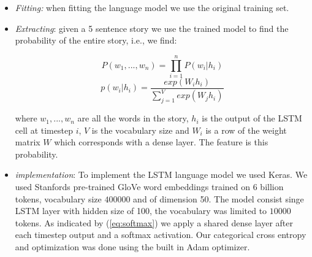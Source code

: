 \documentclass{article}
\begin{document}
\begin{itemize}

	\item \textit{Fitting:} when fitting the language model we use the original training set.

	\item \textit{Extracting}: given a 5 sentence story we use the trained
            model to find the probability of the entire story, i.e., we find:
	\begin{multicols}{2}
		\begin{equation}
		P(w_1, ..., w_n) = \prod_{i=1}^{n} P(w_i|h_i)
		\end{equation}\break
		\begin{equation}
		\label{eq:softmax}
		p(w_i|h_i) = \frac{exp(W_ih_i)}{\sum_{j=1}^{V}exp(W_jh_i)}
		\end{equation}
	\end{multicols}
        where $w_1, ..., w_n$ are all the words in the story, $h_i$ is the
        output of the LSTM cell at timestep $i$, $V$ is the vocabulary size and
        $W_i$ is a row of the weight matrix $W$ which corresponds with a dense
        layer. The feature is this probability.
	
        \item \textit{implementation}: To implement the LSTM language model we
            used Keras. We used Stanfords pre-trained GloVe word
            embeddings trained on 6 billion tokens, vocabulary size $400000$ and
            of dimension 50. The model consist singe LSTM layer with hidden size
            of 100, the vocabulary was limited to $10 000$ tokens. As indicated
            by (\ref{eq:softmax}) we apply a shared dense layer after each
            timestep output and a softmax activation. Our categorical cross
            entropy and optimization was done using the built in Adam optimizer.
	
\end{itemize}
\end{document}
